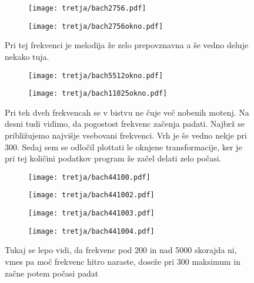 \documentclass{article}
\begin{document}
\begin{figure}[H]
\begin{subfigure}{.5\textwidth}
\texttt{[image: tretja/bach2756.pdf]}

\end{subfigure}
\begin{subfigure}{.5\textwidth}
\texttt{[image: tretja/bach2756okno.pdf]}
\end{subfigure}
\caption*{Pri tej frekvenci je melodija že zelo prepovznavna a še vedno deluje nekako tuja.}
\end{figure}
\begin{figure}[H]
\begin{subfigure}{.5\textwidth}
\texttt{[image: tretja/bach5512okno.pdf]}

\end{subfigure}
\begin{subfigure}{.5\textwidth}
\texttt{[image: tretja/bach11025okno.pdf]}
\end{subfigure}
\caption*{Pri teh dveh frekvencah se v bistvu ne čuje več nobenih motenj. Na desni tudi vidimo, da pogostost frekvenc začenja padati. Najbrž se približujemo najvišje vsebovani frekvenci. Vrh je še vedno nekje pri 300. Sedaj sem se odločil plottati le oknjene transformacije, ker je pri 
tej količini podatkov program že začel delati zelo počasi.}
\end{figure}

\begin{figure}[H]
\begin{subfigure}{.5\textwidth}
\texttt{[image: tretja/bach44100.pdf]}

\end{subfigure}
\begin{subfigure}{.5\textwidth}
\texttt{[image: tretja/bach441002.pdf]}
\end{subfigure}
\end{figure}
\begin{figure}[H]
\begin{subfigure}{.5\textwidth}
\texttt{[image: tretja/bach441003.pdf]}

\end{subfigure}
\begin{subfigure}{.5\textwidth}
\texttt{[image: tretja/bach441004.pdf]}
\end{subfigure}
\caption*{Tukaj se lepo vidi, da frekvenc pod 200 in nad 5000 skorajda ni, vmes pa moč frekvenc hitro naraste, doseže pri 300 maksimum in začne potem počasi padat}
\end{figure}
\end{document}
